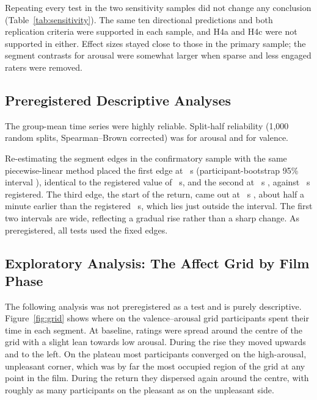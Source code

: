 \documentclass[man,floatsintext,12pt,donotrepeattitle]{apa7}
\begin{document}
Repeating every test in the two sensitivity samples did not change any conclusion (Table~\ref{tab:sensitivity}).
The same ten directional predictions and both replication criteria were supported in each sample, and H4a and
H4c were not supported in either. Effect sizes stayed close to those in the primary sample; the segment contrasts
for arousal were somewhat larger when sparse and less engaged raters were removed.



\subsection{Preregistered Descriptive Analyses}

The group-mean time series were highly reliable. Split-half reliability (1,000 random splits, Spearman--Brown
corrected) was  for arousal and  for valence.

Re-estimating the segment edges in the confirmatory sample with the same piecewise-linear method placed the first
edge at ~s (participant-bootstrap 95\% interval ), identical to the registered value of
~s, and the second at ~s , against ~s registered. The third
edge, the start of the return, came out at ~s , about half a minute earlier than the
registered ~s, which lies just outside the interval. The first two intervals are wide, reflecting a
gradual rise rather than a sharp change. As preregistered, all tests used the fixed edges.

\subsection{Exploratory Analysis: The Affect Grid by Film Phase}

The following analysis was not preregistered as a test and is purely descriptive. Figure~\ref{fig:grid} shows where
on the valence--arousal grid participants spent their time in each segment. At baseline, ratings were spread around
the centre of the grid with a slight lean towards low arousal. During the rise they moved upwards and to the left.
On the plateau most participants converged on the high-arousal, unpleasant corner, which was by far the most
occupied region of the grid at any point in the film. During the return they dispersed again around the centre,
with roughly as many participants on the pleasant as on the unpleasant side.
\end{document}
